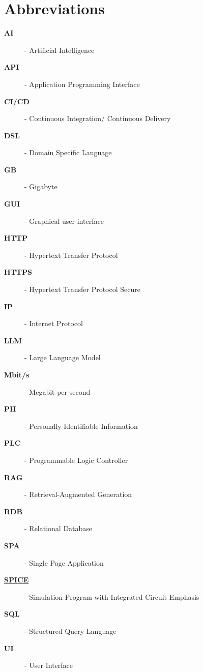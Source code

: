 \newpage

\section{Abbreviations}\label{sec:abbreviations}
\begin{description}
\item[\textbf{AI}]\label{abr:AI} - Artificial Intelligence
\item[\textbf{API}]\label{abr:API} - Application Programming Interface
\item[\textbf{CI/CD}]\label{abr:CI/CD} - Continuous Integration/ Continuous Delivery
\item[\textbf{DSL}]\label{abr:DSL} - Domain Specific Language
\item[\textbf{GB}]\label{abr:GB} - Gigabyte
\item[\textbf{GUI}]\label{abr:GUI} - Graphical user interface
\item[\textbf{HTTP}]\label{abr:HTTP} - Hypertext Transfer Protocol
\item[\textbf{HTTPS}]\label{abr:HTTPS} - Hypertext Transfer Protocol Secure
\item[\textbf{IP}]\label{abr:IP} - Internet Protocol 
\item[\textbf{LLM}]\label{abr:LLM} - Large Language Model
\item[\textbf{Mbit/s}]\label{abr:Mbit/s} - Megabit per second
\item[\textbf{PII}]\label{abr:PII} - Personally Identifiable Information
\item[\textbf{PLC}]\label{abr:PLC} - Programmable Logic Controller
\item[\textbf{\hyperref[def:rag]{RAG}}]\label{abr:RAG} - Retrieval-Augmented Generation
\item[\textbf{RDB}]\label{abr:RDB} - Relational Database
\item[\textbf{SPA}]\label{abr:SPA} - Single Page Application
\item[\textbf{\hyperref[def:spice]{SPICE}}]\label{abr:SPICE} - Simulation Program with Integrated Circuit Emphasis
\item[\textbf{SQL}]\label{abr:SQL} - Structured Query Language
\item[\textbf{UI}]\label{abr:UI} - User Interface
\end{description}

